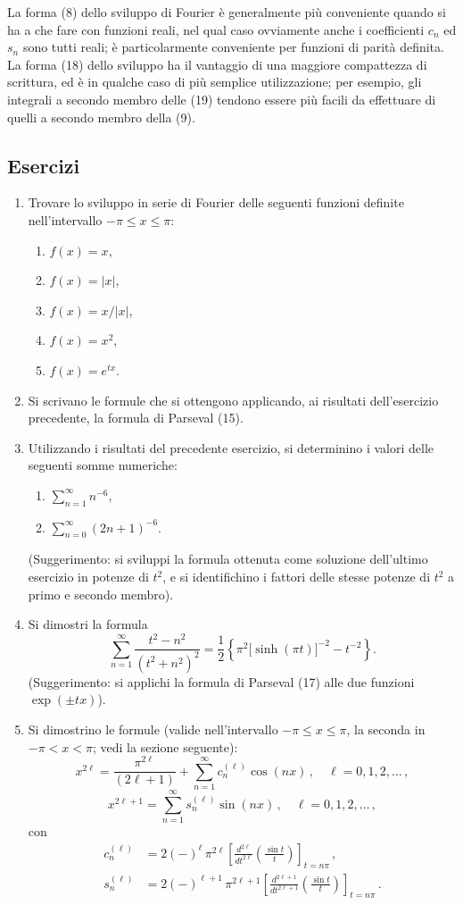 \documentclass[11pt, a4paper]{book}
\numberwithin{equation}{section}
\newenvironment{esercizi}{\subsection*{Esercizi}\begin{enumerate}}{\end{enumerate}}
\begin{document}
La forma (8) dello sviluppo di Fourier è generalmente più conveniente quando si ha a che fare con funzioni reali, nel qual caso ovviamente anche i coefficienti $c_n$ ed $s_n$ sono tutti reali; è particolarmente conveniente per funzioni di parità definita. La forma (18) dello sviluppo ha il vantaggio di una maggiore compattezza di scrittura, ed è in qualche caso di più semplice utilizzazione; per esempio, gli integrali a secondo membro delle (19) tendono essere più facili da effettuare di quelli a secondo membro della (9).

\begin{esercizi}
\item Trovare lo sviluppo in serie di Fourier delle seguenti funzioni definite nell'intervallo $-\pi \leq x \leq \pi$:
\begin{enumerate}
  \item $f(x) = x$,
  \item $f(x) = |x|$,
  \item $f(x) = x/|x|$,
  \item $f(x) = x^2$,
  \item $f(x) = e^{tx}$.
\end{enumerate}

\item Si scrivano le formule che si ottengono applicando, ai risultati dell'esercizio precedente, la formula di Parseval (15).

\item Utilizzando i risultati del precedente esercizio, si determinino i valori delle seguenti somme numeriche:
\begin{enumerate}
  \item $\displaystyle\sum_{n=1}^{\infty} n^{-6}$,
  \item $\displaystyle\sum_{n=0}^{\infty} (2n+1)^{-6}$.
\end{enumerate}
(Suggerimento: si sviluppi la formula ottenuta come soluzione dell'ultimo esercizio in potenze di $t^2$, e si identifichino i fattori delle stesse potenze di $t^2$ a primo e secondo membro).

\item Si dimostri la formula
\[
  \sum_{n=1}^{\infty} \frac{t^2-n^2}{(t^2+n^2)^2}
  = \frac{1}{2}\left\{\pi^2\bigl[\sinh(\pi t)\bigr]^{-2} - t^{-2}\right\}.
\]
(Suggerimento: si applichi la formula di Parseval (17) alle due funzioni $\exp(\pm tx)$).

\item[*] Si dimostrino le formule (valide nell'intervallo $-\pi \leq x \leq \pi$, la seconda in $-\pi < x < \pi$; vedi la sezione seguente):
\[
  x^{2\ell} = \frac{\pi^{2\ell}}{(2\ell+1)} + \sum_{n=1}^{\infty} c_n^{(\ell)}\cos(nx)\,,
  \quad \ell=0,1,2,\ldots\,,
\]
\[
  x^{2\ell+1} = \sum_{n=1}^{\infty} s_n^{(\ell)}\sin(nx)\,,\quad \ell=0,1,2,\ldots\,,
\]
con
\begin{align*}
  c_n^{(\ell)} &= 2(-)^\ell\,\pi^{2\ell}\left[\frac{d^{2\ell}}{dt^{2\ell}}\!\left(\frac{\sin t}{t}\right)\right]_{t=n\pi}\,,\\
  s_n^{(\ell)} &= 2(-)^{\ell+1}\,\pi^{2\ell+1}\left[\frac{d^{2\ell+1}}{dt^{2\ell+1}}\!\left(\frac{\sin t}{t}\right)\right]_{t=n\pi}\,.
\end{align*}
\end{esercizi}
\end{document}
